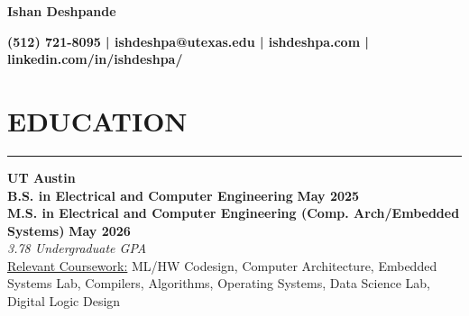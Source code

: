 \documentclass{article}
\newcommand{\sectionHeader}[1]{%
    \vspace{-1.5\baselineskip}
    \section*{\MakeUppercase{\large #1}} %
    \vspace{-1.75\baselineskip} %
    \color{teal}
    \rule{\textwidth}{2pt} %
    \color{black}
    \vspace{-1.5\baselineskip}
}
\begin{document}
\begin{center}
    \textbf{\LARGE Ishan Deshpande}
\end{center}

\begin{center}
    \textbf{\small (512) 721-8095 | ishdeshpa@utexas.edu | ishdeshpa.com | linkedin.com/in/ishdeshpa/}
\end{center}

\sectionHeader{education}       
\begin{flushleft}
    \vspace{2.5pt}
    \textbf{\large UT Austin} \\
    \textbf{B.S. in Electrical and Computer Engineering} \hfill \textbf{May 2025} \\
    \textbf{M.S. in Electrical and Computer Engineering (Comp. Arch/Embedded Systems)} \hfill \textbf{May 2026} \\
    \textit{3.78 Undergraduate GPA} \\
    \underline{Relevant Coursework:} ML/HW Codesign, Computer Architecture, Embedded Systems Lab, Compilers, Algorithms, Operating Systems, Data Science Lab, Digital Logic Design
\end{flushleft}
\end{document}
